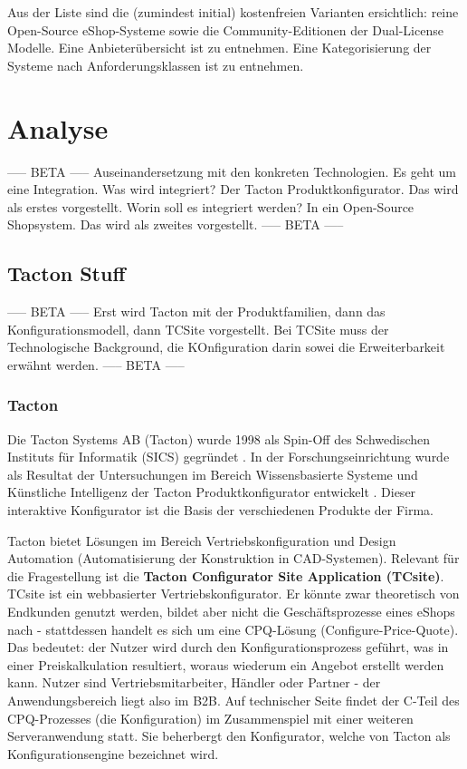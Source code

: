 \documentclass[12pt,a4paper,bibliography=totocnumbered,listof=totoc]{scrartcl}
\begin{document}
Aus der Liste sind die (zumindest initial) kostenfreien Varianten ersichtlich: reine Open-Source eShop-Systeme sowie die Community-Editionen der Dual-License Modelle. Eine Anbieterübersicht ist \citet{t3n14} zu entnehmen. Eine Kategorisierung der Systeme nach Anforderungsklassen ist \citet{graf14} zu entnehmen.

\pagebreak
\section{Analyse}
----- BETA ----- Auseinandersetzung mit den konkreten Technologien. Es geht um eine Integration. Was wird integriert? Der Tacton Produktkonfigurator. Das wird als erstes vorgestellt. Worin soll es integriert werden? In ein Open-Source Shopsystem. Das wird als zweites vorgestellt. ----- BETA ----- 

\subsection{Tacton Stuff}
----- BETA ----- Erst wird Tacton mit der Produktfamilien, dann das Konfigurationsmodell, dann TCSite vorgestellt. Bei TCSite muss der Technologische Background, die KOnfiguration darin sowei die Erweiterbarkeit erwähnt werden. ----- BETA ----- 

\subsubsection{Tacton}
Die Tacton Systems AB (Tacton) wurde 1998 als Spin-Off des Schwedischen Instituts für Informatik (SICS) gegründet \citep{tactonProductOverview}. In der Forschungseinrichtung wurde als Resultat der Untersuchungen im Bereich Wissensbasierte Systeme und Künstliche Intelligenz der Tacton Produktkonfigurator entwickelt \citep{tactonAbout}. Dieser interaktive Konfigurator ist die Basis der verschiedenen Produkte der Firma.

Tacton bietet Lösungen im Bereich Vertriebskonfiguration und Design Automation (Automatisierung der Konstruktion in CAD-Systemen). Relevant für die Fragestellung ist die \textbf{Tacton Configurator Site Application (TCsite)}. TCsite ist ein webbasierter Vertriebskonfigurator. Er könnte zwar theoretisch von Endkunden genutzt werden, bildet aber nicht die Geschäftsprozesse eines eShops nach - stattdessen handelt es sich um eine CPQ-Lösung (Configure-Price-Quote). Das bedeutet: der Nutzer wird durch den Konfigurationsprozess geführt, was in einer Preiskalkulation resultiert, woraus wiederum ein Angebot erstellt werden kann. Nutzer sind Vertriebsmitarbeiter, Händler oder Partner - der Anwendungsbereich liegt also im B2B. Auf technischer Seite findet der C-Teil des CPQ-Prozesses (die Konfiguration) im Zusammenspiel mit einer weiteren Serveranwendung statt. Sie beherbergt den Konfigurator, welche von Tacton als Konfigurationsengine bezeichnet wird.
\end{document}
